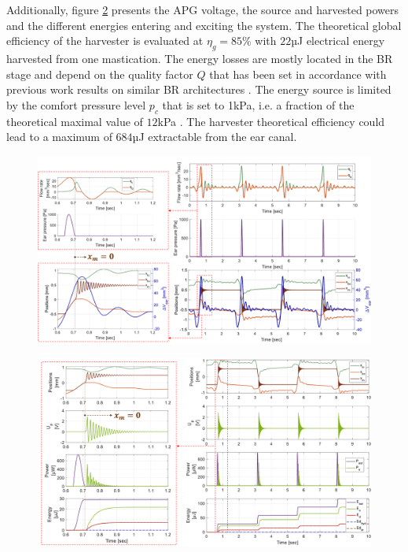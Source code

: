 \documentclass[3p,twocolumn,preprint]{elsarticle}
\begin{document}
Additionally, figure \ref{fig:positions_Up_puissances_energies} presents the APG voltage, the source and harvested powers and the different energies entering and exciting the system. The theoretical global efficiency of the harvester is evaluated at \mbox{$\eta_g=85$\%} with $22$µJ electrical energy harvested from one mastication. The energy losses are mostly located in the BR stage and depend on the quality factor $Q$ that has been set in accordance with previous work results on similar BR architectures \cite{Liu2013}. The energy source is limited by the comfort pressure level $p_c$ that is set to 1kPa, i.e. a fraction of the theoretical maximal value of $12$kPa \cite{Bouchard-Roy2020}. The harvester theoretical efficiency could lead to a maximum of $684$µJ extractable from the ear canal.

\begin{figure}[!htbp]
	\centering
	\captionsetup{justification=centering}
	\includegraphics[trim={0cm 0cm 0cm 0.5cm},clip, width=\textwidth]{figures/positions+DeltaV_debits_pear.pdf}
	\caption{}
	\label{fig:positions+DeltaV_debits_pear}
\end{figure}
\begin{figure}[!htbp]
	\centering
	\captionsetup{justification=centering}
	\includegraphics[trim={0cm 0cm 0cm 0cm},clip, width=\textwidth]{figures/positions_Up_puissances_energies.pdf}
	\caption{}
	\label{fig:positions_Up_puissances_energies}
\end{figure}
\end{document}
